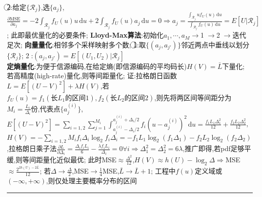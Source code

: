\documentclass[UTF8,a4paper,10pt]{article}
\begin{document}
\begin{multicols*}{2}
    \textcircled{2}:给定$\{\mathcal{R}_j\}$,选$\{a_j\}$,$\frac{\partial\text{MSE}}{\partial a_j}=-2\int_{\mathcal{R}_j}f_U(u)u\,\mathrm{d}u+2\int_{\mathcal{R}_j}f_U(u)a_j\,\mathrm{d}u=0\Rightarrow a_j=\frac{\int_{\mathcal{R}_j}uf_U(u)\,\mathrm{d}u}{\int_{\mathcal{R}_j}f_U(u)\,\mathrm{d}u}=E[U\vert\mathcal{R}_j]$;%
    此即最优量化的必要条件;%
    \textbf{Lloyd-Max算法}:初始化$a_1,\cdots,a_M\rightarrow$\textcircled{1}$\rightarrow$\textcircled{2}$\rightarrow$迭代足次;%
    \textbf{向量量化}:相邻多个采样映射多个数;%
    \textcircled{1}:取$\{(a_j,a_{j'})\}$邻近两点中垂线以划分$\{\mathcal{R}_j\}$;%
    \textcircled{2}:$(a_j,a_{j'})=E[(U_1,U_2)\vert\mathcal{R}_j]$\\
\textbf{定熵量化}:为便于信源编码,在给定熵(即信源编码的平均码长)$H(V)=\bar{L}$下量化;%
    若高精度(high-rate)量化,则等间距量化;%
    证:拉格朗日函数$L=E[(U-V)^2]+\lambda H(V)$,若$f_U(u)=f_1(\text{长}L_1\text{的区间}1),f_2(\text{长}L_2\text{的区间}2)$,则先将两区间等间距分为$M_i=\frac{L_i}{\Delta_i}$份,代表点$\{a_j^{(i)}\}$,$E[(U-V)^2]=\sum_{i=1,2}\sum_{j=1}^{M_i}\int_{a_j^{(i)}-\Delta_i/2}^{a_j^{(i)}+\Delta_i/2}f_i(u-a_j^{(i)})^2\,\mathrm{d}u=\frac{f_1L_1\Delta_1^2}{12}+\frac{f_2L_2\Delta_2^2}{12}$,$H(V)=-\sum_{i=1,2}M_if_i\Delta_i\log_2 f_i\Delta_i=-f_1L_1\log_2(f_1\Delta_1)-f_2L_2\log_2(f_2\Delta_2)$,拉格朗日乘子法$\frac{\partial L}{\partial\Delta_i}=\frac{\Delta_if_iL_i}{6}-\frac{\lambda f_iL_i}{\Delta_i}=0\forall i\Rightarrow\Delta_1^2=\Delta_2^2=6\lambda$,推广即得,若pdf足够平缓,则等间距量化近似最优;%
    此时MSE$\approx\frac{\Delta^2}{12}$,$H(V)\approx h(U)-\log_2\Delta\Rightarrow$MSE$\approx\frac{2^{2h(U)-2\bar{L}}}{12}$;%
    若$\Delta\rightarrow\frac{\Delta}{2}$,MSE$\rightarrow\frac{1}{4}$MSE,$\bar{L}\rightarrow\bar{L}+1$;%
    工程中$f(u)$定义域或$(-\infty,+\infty)$,则仅处理主要概率分布的区间\\
\rule{\columnwidth}{.2pt}\\
\\
\end{multicols*}
\end{document}
